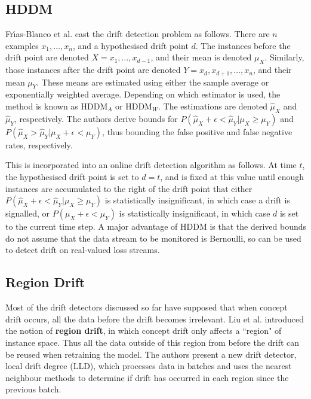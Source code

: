 \subsection{HDDM}

Fr{\'\i}as-Blanco et al. \cite{HDDM} cast the drift detection problem as follows. There are $n$ examples $x_1,\dots,x_n$, and a hypothesised drift point $d$. The instances before the drift point are denoted $X=x_1,\dots,x_{d-1}$, and their mean is denoted $\mu_X$. Similarly, those instances after the drift point are denoted $Y=x_d,x_{d+1},\dots,x_n$, and their mean $\mu_Y$. These means are estimated using either the sample average or exponentially weighted average. Depending on which estimator is used, the method is known as HDDM$_A$ or HDDM$_W$. The estimations are denoted $\hat{\mu}_X$ and $\hat{\mu}_Y$, respectively. The authors derive bounds for $P(\hat{\mu}_X+\epsilon < \hat{\mu}_Y|\mu_X \ge \mu_Y)$ and $P(\hat{\mu}_X > \hat{\mu}_Y|\mu_X+\epsilon < \mu_Y)$, thus bounding the false positive and false negative rates, respectively.

This is incorporated into an online drift detection algorithm as follows. At time $t$, the hypothesised drift point is set to $d=t$, and is fixed at this value until enough instances are accumulated to the right of the drift point that either $P(\hat{\mu}_X+\epsilon < \hat{\mu}_Y|\mu_X \ge \mu_Y)$ is statistically insignificant, in which case a drift is signalled, or $P(\mu_X+\epsilon < \mu_Y)$ is statistically insignificant, in which case $d$ is set to the current time step. A major advantage of HDDM is that the derived bounds do not assume that the data stream to be monitored is Bernoulli, so can be used to detect drift on real-valued loss streams.

\subsection{Region Drift}

Most of the drift detectors discussed so far have supposed that when concept drift occurs, all the data before the drift becomes irrelevant. Liu et al. \cite{LLD} introduced the notion of {\bf region drift}, in which concept drift only affects a ``region" of instance space. Thus all the data outside of this region from before the drift can be reused when retraining the model. The authors present a new drift detector, local drift degree (LLD), which processes data in batches and uses the nearest neighbour methods to determine if drift has occurred in each region since the previous batch.

